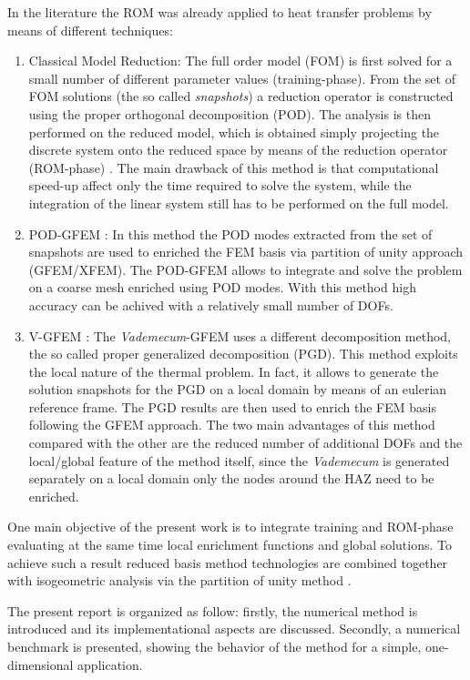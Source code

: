 \documentclass[3p]{article}
\begin{document}
In the literature the ROM was already applied to heat transfer problems by means of different techniques:
\begin{enumerate}
\item Classical Model Reduction: The full order model (FOM) is first solved for a small number of different parameter values (training-phase). From the set of FOM solutions (the so called \textit{snapshots}) a reduction operator is constructed using the proper orthogonal decomposition (POD). The analysis is then performed on the reduced model, which is obtained simply projecting the discrete system onto the reduced space by means of the reduction operator (ROM-phase) \cite{Michopoulos2014a}.
The main drawback of this method is that computational speed-up affect only the time required to solve the system, while the integration of the linear system still has to be performed on the full model.
\item {POD-GFEM} \cite{Aquino2008}: In this method the POD modes extracted from the set of snapshots are used to enriched the FEM basis via partition of unity \cite{Babuska1997} approach (GFEM/XFEM). The POD-GFEM allows to integrate and solve the problem on a coarse mesh enriched using POD modes. With this method high accuracy can be achived with a relatively small number of DOFs.
\item {V-GFEM} \cite{Canales2016a}: The \textit{Vademecum}-GFEM uses a different decomposition method, the so called proper generalized decomposition (PGD). This method exploits the local nature of the thermal problem. In fact, it allows to generate the solution snapshots for the PGD on a local domain by means of an eulerian reference frame. The PGD results are then used to enrich the FEM basis following the GFEM approach. The two main advantages of this method compared with the other are the reduced number of additional DOFs and the local/global feature of the method itself, since the \textit{Vademecum} is generated separately on a local domain only the nodes around the HAZ need to be enriched.
\end{enumerate}
One main objective of the present work is to integrate training and ROM-phase evaluating at the same time local enrichment functions and global solutions. To achieve such a result reduced basis method technologies are combined together with isogeometric analysis \cite{cottrell_isogeometric_2009, nguyen_isogeometric_2013} via the partition of unity method \cite{Babuska1997}.
\par
The present report is organized as follow: firstly, the numerical method is introduced and its implementational aspects are discussed. Secondly, a numerical benchmark is presented, showing the behavior of the method for a simple, one-dimensional application.
\end{document}
